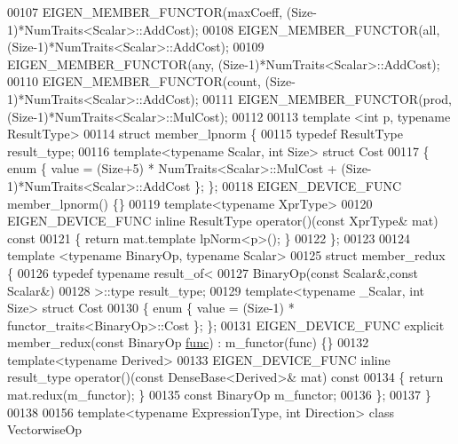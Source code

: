 \begin{DoxyCode}
00107 EIGEN\_MEMBER\_FUNCTOR(maxCoeff, (Size-1)*NumTraits<Scalar>::AddCost);
00108 EIGEN\_MEMBER\_FUNCTOR(all, (Size-1)*NumTraits<Scalar>::AddCost);
00109 EIGEN\_MEMBER\_FUNCTOR(any, (Size-1)*NumTraits<Scalar>::AddCost);
00110 EIGEN\_MEMBER\_FUNCTOR(count, (Size-1)*NumTraits<Scalar>::AddCost);
00111 EIGEN\_MEMBER\_FUNCTOR(prod, (Size-1)*NumTraits<Scalar>::MulCost);
00112 
00113 \textcolor{keyword}{template} <\textcolor{keywordtype}{int} p, \textcolor{keyword}{typename} ResultType>
00114 \textcolor{keyword}{struct }member\_lpnorm \{
00115   \textcolor{keyword}{typedef} ResultType result\_type;
00116   \textcolor{keyword}{template}<\textcolor{keyword}{typename} Scalar, \textcolor{keywordtype}{int} Size> \textcolor{keyword}{struct }Cost
00117   \{ \textcolor{keyword}{enum} \{ value = (Size+5) * NumTraits<Scalar>::MulCost + (Size-1)*NumTraits<Scalar>::AddCost \}; \};
00118   EIGEN\_DEVICE\_FUNC member\_lpnorm() \{\}
00119   \textcolor{keyword}{template}<\textcolor{keyword}{typename} XprType>
00120   EIGEN\_DEVICE\_FUNC \textcolor{keyword}{inline} ResultType operator()(\textcolor{keyword}{const} XprType& mat)\textcolor{keyword}{ const}
00121 \textcolor{keyword}{  }\{ \textcolor{keywordflow}{return} mat.template lpNorm<p>(); \}
00122 \};
00123 
00124 \textcolor{keyword}{template} <\textcolor{keyword}{typename} BinaryOp, \textcolor{keyword}{typename} Scalar>
00125 \textcolor{keyword}{struct }member\_redux \{
00126   \textcolor{keyword}{typedef} \textcolor{keyword}{typename} result\_of<
00127                      BinaryOp(\textcolor{keyword}{const} Scalar&,\textcolor{keyword}{const} Scalar&)
00128                    >::type  result\_type;
00129   \textcolor{keyword}{template}<\textcolor{keyword}{typename} \_Scalar, \textcolor{keywordtype}{int} Size> \textcolor{keyword}{struct }Cost
00130   \{ \textcolor{keyword}{enum} \{ value = (Size-1) * functor\_traits<BinaryOp>::Cost \}; \};
00131   EIGEN\_DEVICE\_FUNC \textcolor{keyword}{explicit} member\_redux(\textcolor{keyword}{const} BinaryOp \hyperlink{structfunc}{func}) : m\_functor(func) \{\}
00132   \textcolor{keyword}{template}<\textcolor{keyword}{typename} Derived>
00133   EIGEN\_DEVICE\_FUNC \textcolor{keyword}{inline} result\_type operator()(\textcolor{keyword}{const} DenseBase<Derived>& mat)\textcolor{keyword}{ const}
00134 \textcolor{keyword}{  }\{ \textcolor{keywordflow}{return} mat.redux(m\_functor); \}
00135   \textcolor{keyword}{const} BinaryOp m\_functor;
00136 \};
00137 \}
00138 
00156 \textcolor{keyword}{template}<\textcolor{keyword}{typename} ExpressionType, \textcolor{keywordtype}{int} Direction> \textcolor{keyword}{class }VectorwiseOp

\end{DoxyCode}
